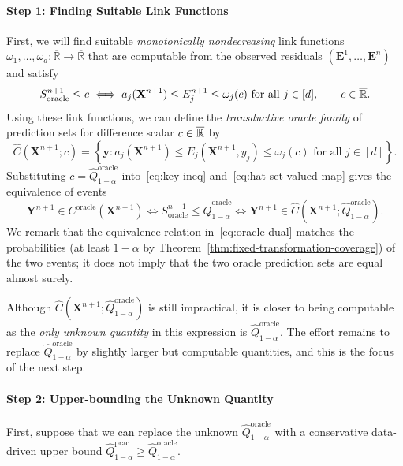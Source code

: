 \paragraph{Step 1: Finding Suitable Link Functions}
First, we will find suitable \emph{monotonically nondecreasing} link functions $\omega_1,\ldots,\omega_d:\overline{\mathbb R}\to\overline{\mathbb R}$ that are computable from the observed residuals $(\mathbf E^1,\ldots,\mathbf E^n)$ and satisfy
\begin{equation}
S^{n+1}_{\mathrm{oracle}}\leq c
\iff
a_j(\mathbf X^{n+1})
\leq E_j^{n+1}\leq\omega_j(c)
\text{ for all }j\in[d],
\qquad
c\in\overline{\mathbb{R}}.
\label{eq:key-ineq}
\end{equation}
Using these link functions, we can define the \emph{transductive oracle family} of prediction sets for difference scalar $c\in\overline{\mathbb{R}}$ by
\begin{equation}
\hat C(\mathbf X^{n+1};c)
=
\left\{
\mathbf y:
a_j(\mathbf X^{n+1})
\leq E_j(\mathbf X^{n+1},y_j)\leq\omega_j(c)
\text{ for all }j\in[d]
\right\}.
\label{eq:hat-set-valued-map}
\end{equation}
Substituting $c=\hat Q^{\mathrm{oracle}}_{1-\alpha}$ into~\eqref{eq:key-ineq} and~\eqref{eq:hat-set-valued-map} gives the equivalence of events
\begin{equation}\label{eq:oracle-dual}
\mathbf Y^{n+1}\in C^{\mathrm{oracle}}(\mathbf X^{n+1})
\iff
S^{n+1}_{\mathrm{oracle}}\leq\hat Q^{\mathrm{oracle}}_{1-\alpha}
\iff
\mathbf Y^{n+1}\in
\hat C(\mathbf X^{n+1};\hat Q^{\mathrm{oracle}}_{1-\alpha}).
\end{equation}
We remark that
the equivalence relation in~\eqref{eq:oracle-dual} matches the probabilities (at least $1-\alpha$ by Theorem~\ref{thm:fixed-transformation-coverage}) of the two events; it does not imply that the two oracle prediction sets are equal almost surely.

Although $\hat C(\mathbf X^{n+1};\hat Q^{\mathrm{oracle}}_{1-\alpha})$ is still impractical, it is closer to being computable as the \emph{only unknown quantity} in this expression is $\hat Q^{\mathrm{oracle}}_{1-\alpha}$. The effort remains to replace $\hat Q^{\mathrm{oracle}}_{1-\alpha}$ by slightly larger but computable quantities, and this is the focus of the next step.

\paragraph{Step 2: Upper-bounding the Unknown Quantity}
First, suppose that we can replace the unknown $\hat Q^{\mathrm{oracle}}_{1-\alpha}$ with a conservative data-driven upper bound $\hat Q^{\mathrm{prac}}_{1-\alpha}\geq\hat Q^{\mathrm{oracle}}_{1-\alpha}$.

